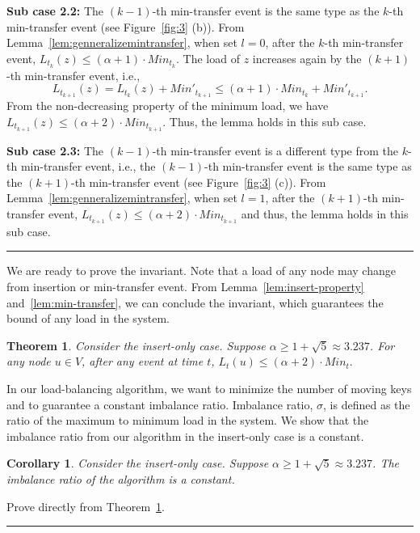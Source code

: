 \documentclass[a4paper]{article}
\newtheorem{theorem}{Theorem}
\newtheorem{corollary}{Corollary}
\newenvironment{proof}{{\bf Proof:}}{\hfill\rule{1.5mm}{3mm}\vspace{0.1in}}
\begin{document}
\begin{proof}
  \textbf{Sub case 2.2:} The $(k-1)$-th min-transfer event is the same
  type as the $k$-th min-transfer event (see Figure~\ref{fig:3} (b)).
  From Lemma~\ref{lem:genneralizemintransfer}, when set $l=0$, after the
  $k$-th min-transfer event, $L_{t_{k}}(z)\leq(\alpha+1)\cdot Min_{t_{k}}$. The load of  $z$ increases again by the
  $(k+1)$-th min-transfer event, i.e.,
  \[ L_{t_{k+1}}(z)=  L_{t_{k}}(z) + Min'_{t_{k+1}}\leq (\alpha+1)\cdot Min_{t_{k}}+ Min'_{t_{k+1}}.\]
   From the non-decreasing property of the minimum load,
  we have $L_{t_{k+1}}(z)\leq (\alpha+2)\cdot Min_{t_{k+1}}$.  Thus,
  the lemma holds in this sub case.

  \textbf{Sub case 2.3:} The $(k-1)$-th min-transfer event is a
  different type from the $k$-th min-transfer event, i.e., the
  $(k-1)$-th min-transfer event is the same type as the $(k+1)$-th
  min-transfer event (see Figure~\ref{fig:3} (c)). From
  Lemma~\ref{lem:genneralizemintransfer}, when set $l=1$,  
  after the $(k+1)$-th min-transfer event, $L_{t_{k+1}}(z)\leq(\alpha +
  2)\cdot Min_{t_{k+1}}$ and thus, the lemma holds in this sub case.
\end{proof}

We are ready to prove the invariant. Note that a load of any node
may change from insertion or min-transfer event.  From
Lemma~\ref{lem:insert-property} and~\ref{lem:min-transfer}, we can
conclude the invariant, which guarantees the bound of any load in the
system.

\begin{theorem}\label{thm:maxload}
  Consider the insert-only case. Suppose $\alpha \geq 1+\sqrt{5}
  \approx 3.237$. For any node $u \in V$, after any event at time
  $t$, $ L_t(u)\leq(\alpha+2)\cdot Min_t.  $
\end{theorem}
	
In our load-balancing algorithm, we want to minimize the number of
moving keys and to guarantee a constant imbalance ratio.  Imbalance
ratio, $\sigma$, is defined as the ratio of the maximum to minimum
load in the system. We show that the imbalance ratio from our
algorithm in the insert-only case is a constant.

\begin{corollary}\label{thm:Imbalance_ratio}
  Consider the insert-only case. Suppose $\alpha \geq 1+\sqrt{5}
  \approx 3.237$. The imbalance ratio of the algorithm is a constant.
\end{corollary}

\begin{proof}
  Prove directly from Theorem~\ref{thm:maxload}.
\end{proof}
\end{document}

